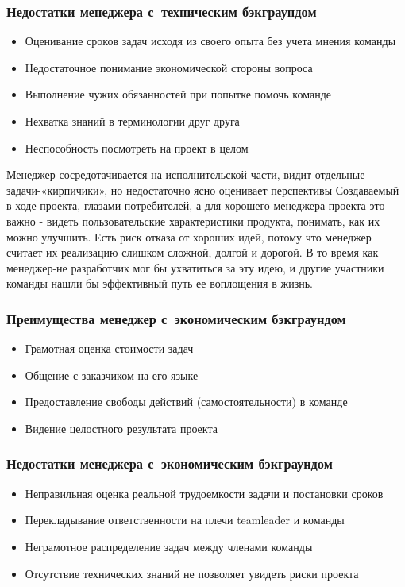 \documentclass{../industrial-development}
\begin{document}
{\begin{frame} \frametitle{Недостатки менеджера с~техническим бэкграундом}
	 \begin{itemize}
                      \item Оценивание сроков задач исходя из своего опыта без учета мнения команды
		\item Недостаточное понимание экономической стороны вопроса
		\item Выполнение чужих обязанностей при попытке помочь команде
		\item Нехватка знаний в терминологии друг друга
		\item Неспособность посмотреть на проект в целом
	\end{itemize} 	
\end{frame}
\lecturenotes
Менеджер сосредотачивается на исполнительской части, видит отдельные задачи\nobreakdash-«кирпичики», но недостаточно ясно оценивает перспективы
Создаваемый в ходе проекта, глазами потребителей, а для хорошего менеджера проекта это важно \nobreakdash- видеть пользовательские характеристики продукта, понимать, как их можно улучшить.
Есть риск отказа от хороших идей, потому что менеджер считает их реализацию слишком сложной, долгой и дорогой. В то время как менеджер-не разработчик мог бы ухватиться за эту идею, и другие участники команды нашли бы эффективный путь ее воплощения в жизнь.


\begin{frame} \frametitle{Преимущества менеджер с~экономическим бэкграундом}
	 \begin{itemize}
                      \item Грамотная оценка стоимости задач
		\item Общение с заказчиком на его языке
		\item Предоставление свободы действий (самостоятельности) в команде
		\item Видение целостного результата проекта
	\end{itemize} 	
\end{frame}
\lecturenotes



\begin{frame} \frametitle{Недостатки менеджера с~экономическим бэкграундом}
	 \begin{itemize}
                      \item Неправильная оценка реальной трудоемкости задачи и постановки сроков
		\item Перекладывание ответственности на плечи teamleader и команды
		\item Неграмотное распределение задач между членами команды
		\item Отсутствие технических знаний не позволяет увидеть риски проекта
	\end{itemize} 	
\end{frame}
\lecturenotes

}
\end{document}
